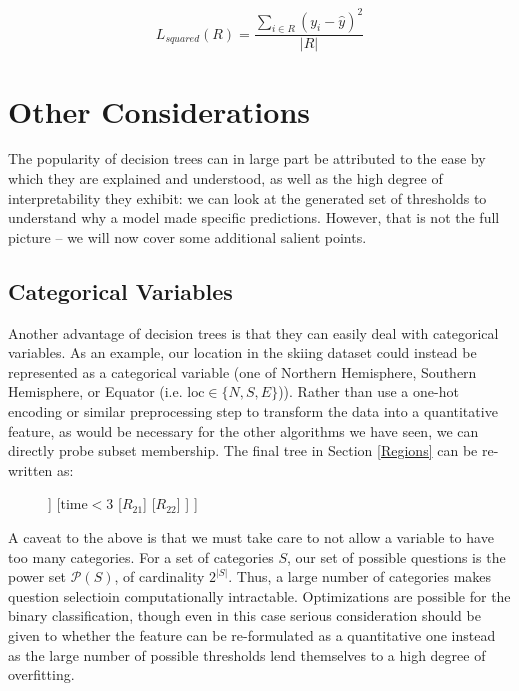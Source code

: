 \documentclass{article}
\begin{document}
$$L_{squared}(R) = \frac{\sum_{i \in R} (y_i - \hat{y})^2}{|R|}$$

\section{Other Considerations}

The popularity of decision trees can in large part be attributed to the ease by which they are explained and understood, as well as the high degree of interpretability they exhibit: we can look at the generated set of thresholds to understand why a model made specific predictions.  However, that is not the full picture -- we will now cover some additional salient points.

\subsection{Categorical Variables}

Another advantage of decision trees is that they can easily deal with categorical variables.  As an example, our location in the skiing dataset could instead be represented as a categorical variable (one of Northern Hemisphere, Southern Hemisphere, or Equator (i.e. $\text{loc} \in \{ N, S, E\}$)).  Rather than use a one-hot encoding or similar preprocessing step to transform the data into a quantitative feature, as would be necessary for the other algorithms we have seen, we can directly probe subset membership.   The final tree in Section \ref{Regions} can be re-written as:

\begin{figure}[H]
\centering
\begin{forest}
[$\text{loc} \in \set{S, E}$, tikz={\draw[{Latex}-, thick] (.north) --++ (0,1);}
	[$\text{loc} \in \set{S}$
    			[$R_{11}$] 
   		 	[$R_{12}$] 
		]   
	[$\text{time} < 3$
			[$R_{21}$] 
			[$R_{22}$]  
	]   
] 
\end{forest}
\end{figure}

A caveat to the above is that we must take care to not allow a variable to have too many categories.  For a set of categories $S$, our set of possible questions is the power set $\mathcal{P}(S)$, of cardinality $2^{|S|}$.  Thus, a large number of categories makes question selectioin computationally intractable.  Optimizations are possible for the binary classification, though even in this case serious consideration should be given to whether the feature can be re-formulated as a quantitative one instead as the large number of possible thresholds lend themselves to a high degree of overfitting.
\end{document}
